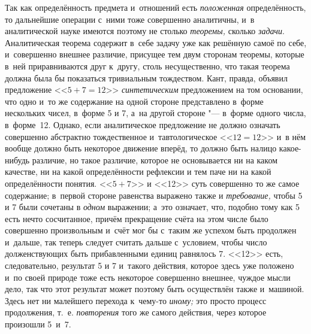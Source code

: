 Так как определённость предмета и~отношений есть {\em положенная}
определённость, то дальнейшие операции с~ними тоже совершенно
аналитичны, и~в аналитической науке имеются поэтому не столько
{\em теоремы,} сколько {\em задачи}.
Аналитическая теорема содержит в~себе задачу уже как решённую
самоё по себе, и~совершенно внешнее различие, присущее тем двум сторонам
теоремы, которые в~ней приравниваются друг к~другу, столь несущественно,
что такая теорема должна была бы показаться тривиальным тождеством. Кант,
правда, объявил предложение <<$5+7=12$>> {\em синтетическим}
предложением на том основании, что одно и~то же содержание на
одной стороне представлено в~форме нескольких чисел, в~форме 5 и 7, а~на
другой стороне "--- в~форме одного числа, в~форме~12.
Однако, если аналитическое предложение не
должно означать совершенно абстрактно тождественное и~тавтологическое
<<$12=12$>> и~в нём вообще должно быть некоторое движение вперёд, то должно
быть налицо какое-нибудь различие, но такое различие, которое не
основывается ни на каком качестве, ни на какой определённости рефлексии и
тем паче ни на какой определённости понятия. <<$5+7$>> и <<12>> суть совершенно
то же самое содержание; в~первой стороне равенства выражено также и
{\em требование,} чтобы 5 и 7 были сочетаны в {\em одном}
выражении; а~это означает, что, подобно тому как 5 есть нечто
сосчитанное, причём прекращение счёта на этом числе было совершенно
произвольным и~счёт мог бы с~таким же успехом быть продолжен и~дальше, так
теперь следует считать дальше с~условием, чтобы число долженствующих быть
прибавленными единиц равнялось 7. <<12>> есть, следовательно, результат 5 и 7
и~такого действия, которое здесь уже положено и~по своей природе тоже есть
некоторое совершенно внешнее, чуждое мысли дело, так что этот результат
может поэтому быть осуществлён также и~машиной. Здесь нет ни малейшего
перехода к~чему-то {\em иному;} это просто процесс продолжения, т.~е.
{\em повторения} того же самого действия, через которое произошли 5~и~7.

